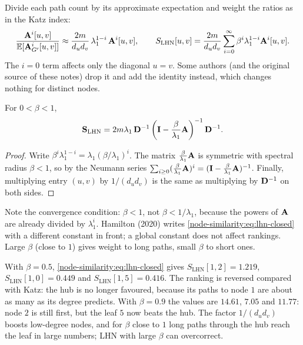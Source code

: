 \begin{notechapter}
Divide each path count by its approximate expectation and weight the ratios as in the Katz index:
\[
\frac{\mathbf{A}^i[u,v]}{\mathbb{E}[\mathbf{A}_{G'}^i[u,v]]} \approx \frac{2m}{d_ud_v}\,\lambda_1^{1-i}\,\mathbf{A}^i[u,v],
\qquad
S_{\text{LHN}}[u,v] = \frac{2m}{d_ud_v}\sum_{i=0}^\infty\beta^i\lambda_1^{1-i}\mathbf{A}^i[u,v].
\]
The $i = 0$ term affects only the diagonal $u = v$. Some authors (and the original source of these notes) drop it and add the identity instead, which changes nothing for distinct nodes.

\begin{theorem}\label{node-similarity:thm:lhn-closed}
For $0 < \beta < 1$,
\begin{equation}
\mathbf{S}_{\text{LHN}} = 2m\lambda_1\,\mathbf{D}^{-1}\left(\mathbf{I} - \frac{\beta}{\lambda_1}\mathbf{A}\right)^{-1}\mathbf{D}^{-1}.
\label{node-similarity:eq:lhn-closed}
\end{equation}
\end{theorem}

\begin{proof}
Write $\beta^i\lambda_1^{1-i} = \lambda_1(\beta/\lambda_1)^i$. The matrix $\frac{\beta}{\lambda_1}\mathbf{A}$ is symmetric with spectral radius $\beta < 1$, so by the Neumann series $\sum_{i\ge0}(\frac{\beta}{\lambda_1}\mathbf{A})^i = (\mathbf{I} - \frac{\beta}{\lambda_1}\mathbf{A})^{-1}$. Finally, multiplying entry $(u, v)$ by $1/(d_ud_v)$ is the same as multiplying by $\mathbf{D}^{-1}$ on both sides.
\end{proof}

Note the convergence condition: $\beta < 1$, not $\beta < 1/\lambda_1$, because the powers of $\mathbf{A}$ are already divided by $\lambda_1^i$. Hamilton (2020) writes \cref{node-similarity:eq:lhn-closed} with a different constant in front; a global constant does not affect rankings. Large $\beta$ (close to $1$) gives weight to long paths, small $\beta$ to short ones.

\begin{example}
With $\beta = 0.5$, \cref{node-similarity:eq:lhn-closed} gives $S_{\text{LHN}}[1,2] = 1.219$, $S_{\text{LHN}}[1,0] = 0.449$ and $S_{\text{LHN}}[1,5] = 0.416$. The ranking is reversed compared with Katz: the hub is no longer favoured, because its paths to node $1$ are about as many as its degree predicts. With $\beta = 0.9$ the values are $14.61$, $7.05$ and $11.77$: node $2$ is still first, but the leaf $5$ now beats the hub. The factor $1/(d_ud_v)$ boosts low-degree nodes, and for $\beta$ close to $1$ long paths through the hub reach the leaf in large numbers; LHN with large $\beta$ can overcorrect.
\end{example}


\end{notechapter}
